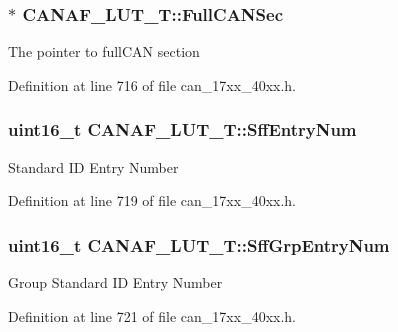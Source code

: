 \subsubsection[{\texorpdfstring{Full\+C\+A\+N\+Sec}{FullCANSec}}]{$\ast$ C\+A\+N\+A\+F\+\_\+\+L\+U\+T\+\_\+\+T\+::\+Full\+C\+A\+N\+Sec}\hypertarget{structCANAF__LUT__T_a7faf17c00ee110a91d7339aacd4fda41}{}\label{structCANAF__LUT__T_a7faf17c00ee110a91d7339aacd4fda41}
The pointer to full\+C\+AN section 

Definition at line 716 of file can\+\_\+17xx\+\_\+40xx.\+h.

\subsubsection[{\texorpdfstring{Sff\+Entry\+Num}{SffEntryNum}}]{\setlength{\rightskip}{0pt plus 5cm}uint16\+\_\+t C\+A\+N\+A\+F\+\_\+\+L\+U\+T\+\_\+\+T\+::\+Sff\+Entry\+Num}\hypertarget{structCANAF__LUT__T_aa5b3264e0fb44bbb7f3bf16ee367cc2e}{}\label{structCANAF__LUT__T_aa5b3264e0fb44bbb7f3bf16ee367cc2e}
Standard ID Entry Number 

Definition at line 719 of file can\+\_\+17xx\+\_\+40xx.\+h.

\subsubsection[{\texorpdfstring{Sff\+Grp\+Entry\+Num}{SffGrpEntryNum}}]{\setlength{\rightskip}{0pt plus 5cm}uint16\+\_\+t C\+A\+N\+A\+F\+\_\+\+L\+U\+T\+\_\+\+T\+::\+Sff\+Grp\+Entry\+Num}\hypertarget{structCANAF__LUT__T_ae7d8ed9ef4c6d5b4bef0be1068ea0c8d}{}\label{structCANAF__LUT__T_ae7d8ed9ef4c6d5b4bef0be1068ea0c8d}
Group Standard ID Entry Number 

Definition at line 721 of file can\+\_\+17xx\+\_\+40xx.\+h.

